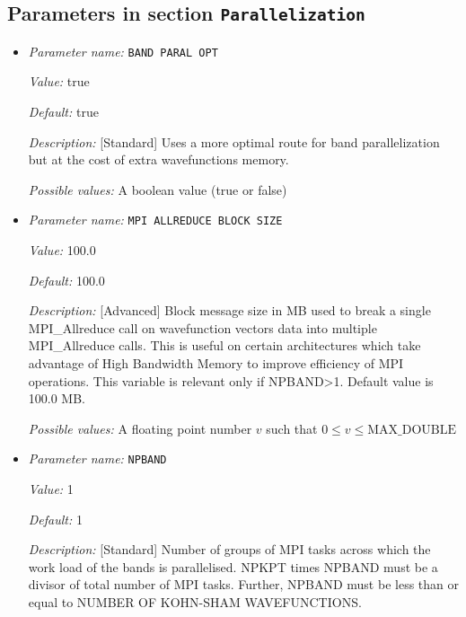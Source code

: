 \subsection{Parameters in section \tt Parallelization}
\label{parameters:Parallelization}

\begin{itemize}
\item {\it Parameter name:} {\tt BAND PARAL OPT}
\label{parameters:Parallelization/BAND PARAL OPT}
\label{parameters:Parallelization/BAND_20PARAL_20OPT}


{\it Value:} true


{\it Default:} true


{\it Description:} [Standard] Uses a more optimal route for band parallelization but at the cost of extra wavefunctions memory.


{\it Possible values:} A boolean value (true or false)
\item {\it Parameter name:} {\tt MPI ALLREDUCE BLOCK SIZE}
\label{parameters:Parallelization/MPI ALLREDUCE BLOCK SIZE}
\label{parameters:Parallelization/MPI_20ALLREDUCE_20BLOCK_20SIZE}


{\it Value:} 100.0


{\it Default:} 100.0


{\it Description:} [Advanced] Block message size in MB used to break a single MPI_Allreduce call on wavefunction vectors data into multiple MPI_Allreduce calls. This is useful on certain architectures which take advantage of High Bandwidth Memory to improve efficiency of MPI operations. This variable is relevant only if NPBAND>1. Default value is 100.0 MB.


{\it Possible values:} A floating point number $v$ such that $0 \leq v \leq \text{MAX\_DOUBLE}$
\item {\it Parameter name:} {\tt NPBAND}
\label{parameters:Parallelization/NPBAND}


{\it Value:} 1


{\it Default:} 1


{\it Description:} [Standard] Number of groups of MPI tasks across which the work load of the bands is parallelised. NPKPT times NPBAND must be a divisor of total number of MPI tasks. Further, NPBAND must be less than or equal to NUMBER OF KOHN-SHAM WAVEFUNCTIONS.



\end{itemize}
